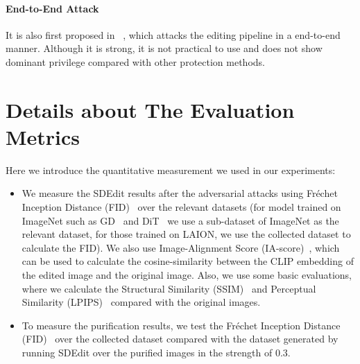 \paragraph{End-to-End Attack} It is also first proposed in ~\cite{salman2023raising}, which attacks the editing pipeline in a end-to-end manner. Although it is strong, it is not practical to use and does not show dominant privilege compared with other protection methods.

\section{Details about The Evaluation Metrics}\label{supp:section:eval_metrics}

 Here we introduce the quantitative measurement we used in our experiments: 

 \begin{itemize}
     \item We measure the SDEdit results after the adversarial attacks using Fréchet Inception Distance (FID)~\citep{fid} over the relevant datasets (for model trained on ImageNet such as GD~\cite{guideddiffusion} and DiT~\cite{dit} we use a sub-dataset of ImageNet as the relevant dataset, for those trained on LAION, we use the collected dataset to calculate the FID). We also use Image-Alignment Score (IA-score)~\citep{la-score}, which can be used to calculate the cosine-similarity between the CLIP embedding of the edited image and the original image. Also, we use some basic evaluations, where we calculate the Structural Similarity (SSIM)~\citep{ssim} and Perceptual Similarity (LPIPS)~\citep{lpips} compared with the original images.

     \item To measure the purification results, we test the Fréchet Inception Distance (FID)~\citep{fid} over the collected dataset compared with the dataset generated by running SDEdit over the purified images in the strength of $0.3$.
 \end{itemize}
 






